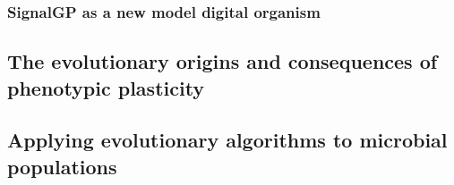 \subsubsection{SignalGP as a new model digital organism}


\subsection{The evolutionary origins and consequences of phenotypic plasticity}


 

\subsection{Applying evolutionary algorithms to microbial populations}

